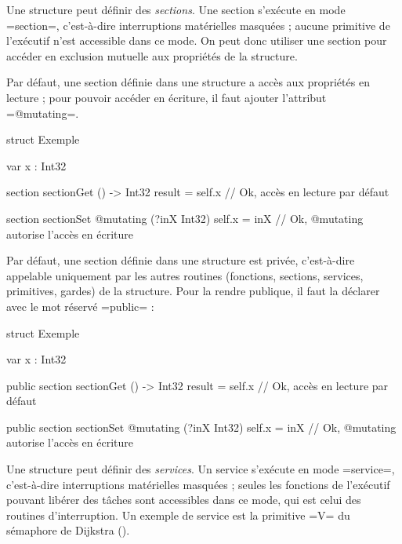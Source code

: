 

Une structure peut définir des \emph{sections}. Une section s'exécute en mode \plm=section=, c'est-à-dire interruptions matérielles masquées ; aucune primitive de l'exécutif n'est accessible dans ce mode. On peut donc utiliser une section pour accéder en exclusion mutuelle aux propriétés de la structure.

Par défaut, une section définie dans une structure a accès aux propriétés en lecture ; pour pouvoir accéder en écriture, il faut ajouter l'attribut \plm=@mutating=.

\begin{PLM}
struct Exemple {
  var x : Int32
  
  section sectionGet () -> Int32 {
    result = self.x // Ok, accès en lecture par défaut
  }

  section sectionSet @mutating (?inX Int32) {
    self.x = inX // Ok, @mutating  autorise l'accès en écriture
  }

}
\end{PLM}

Par défaut, une section définie dans une structure est privée, c'est-à-dire appelable uniquement par les autres routines (fonctions, sections, services, primitives, gardes) de la structure. Pour la rendre publique, il faut la déclarer avec le mot réservé \plm=public= :


\begin{PLM}
struct Exemple {
  var x : Int32
  
  public section sectionGet () -> Int32 {
    result = self.x // Ok, accès en lecture par défaut
  }

  public section sectionSet @mutating (?inX Int32) {
    self.x = inX // Ok, @mutating  autorise l'accès en écriture
  }

}
\end{PLM}








Une structure peut définir des \emph{services}. Un service s'exécute en mode \plm=service=, c'est-à-dire interruptions matérielles masquées ; seules les fonctions de l'exécutif pouvant libérer des tâches sont accessibles dans ce mode, qui est celui des routines d'interruption. Un exemple de service est la primitive \plm=V= du sémaphore de Dijkstra ().

